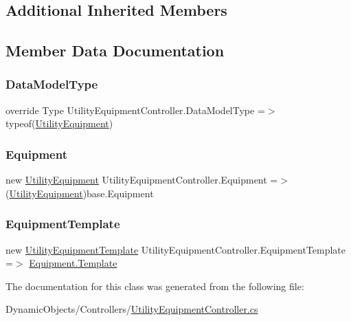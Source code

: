 \subsection*{Additional Inherited Members}


\subsection{Member Data Documentation}
\mbox{\label{class_utility_equipment_controller_a7c5f9d10210bc202ae516a5bf0ff3c39}} 
\subsubsection{\texorpdfstring{Data\+Model\+Type}{DataModelType}}
{\footnotesize\ttfamily override Type Utility\+Equipment\+Controller.\+Data\+Model\+Type =$>$ typeof(\mbox{\hyperlink{class_utility_equipment}{Utility\+Equipment}})\hspace{0.3cm}{\ttfamily [protected]}}

\mbox{\label{class_utility_equipment_controller_a44a8fae78163d7e45aac8c3b5c21a071}} 
\subsubsection{\texorpdfstring{Equipment}{Equipment}}
{\footnotesize\ttfamily new \mbox{\hyperlink{class_utility_equipment}{Utility\+Equipment}} Utility\+Equipment\+Controller.\+Equipment =$>$ (\mbox{\hyperlink{class_utility_equipment}{Utility\+Equipment}})base.\+Equipment}

\mbox{\label{class_utility_equipment_controller_a6e31152dd67ca7a5dea510d97676f7b6}} 
\subsubsection{\texorpdfstring{Equipment\+Template}{EquipmentTemplate}}
{\footnotesize\ttfamily new \mbox{\hyperlink{class_utility_equipment_template}{Utility\+Equipment\+Template}} Utility\+Equipment\+Controller.\+Equipment\+Template =$>$ \mbox{\hyperlink{class_equipment_a691c8de53afa564d0b1a0f1adb0978b7}{Equipment.\+Template}}}



The documentation for this class was generated from the following file\+:\begin{DoxyCompactItemize}
\item 
Dynamic\+Objects/\+Controllers/\mbox{\hyperlink{_utility_equipment_controller_8cs}{Utility\+Equipment\+Controller.\+cs}}\end{DoxyCompactItemize}
